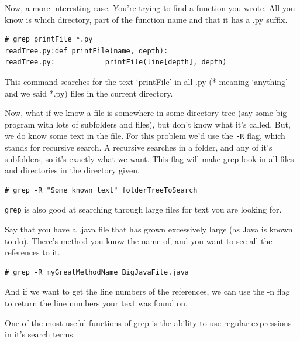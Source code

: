 Now, a more interesting case.  You're trying to find a function
you wrote.  All you know is which directory, part of the 
function name and that it has a .py suffix.

{\tt \begin{verbatim}
# grep printFile *.py
readTree.py:def printFile(name, depth):
readTree.py:            printFile(line[depth], depth)
\end{verbatim}
}
This command searches for the text `printFile' in all .py (* meaning `anything' and we said *.py) 
files in the current  directory. 

Now, what if we know a file is somewhere in some directory tree
(say some big program with lots of subfolders and files), but don't
know what it's called.  But, we do know some text in the file.
For this problem we'd use the {\tt -R} flag, which stands for recursive search.
A recursive searches in a folder, and any of it's subfolders, so it's exactly what we want.  
This flag will make grep look in all files and directories in the 
directory given.

{\tt \begin{verbatim}
# grep -R "Some known text" folderTreeToSearch
\end{verbatim}
}


{\tt grep} is also good at searching through large files for text you 
are looking for.

Say that you have a .java file that has grown excessively large (as Java is known
to do).
There's method you know the name of, and you want to see all the references to it.

{\tt \begin{verbatim}
# grep -R myGreatMethodName BigJavaFile.java 
\end{verbatim}
}

And if we want to get the line numbers of the references, we can use the -n flag to return
the line numbers your text was found on.

One of the most useful functions of grep is the ability to use regular
expressions in it's search terms.





